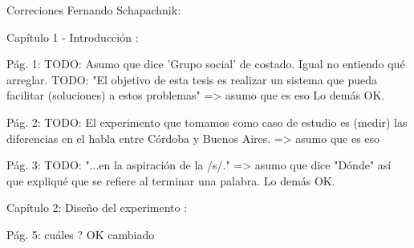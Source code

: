 Correciones Fernando Schapachnik:

Capítulo 1 - Introducción :

Pág. 1:
TODO: Asumo que dice 'Grupo social' de costado. Igual no entiendo qué arreglar.
TODO: "El objetivo de esta tesis es realizar un sistema que pueda facilitar (soluciones) a estos problemas" => asumo que es eso
Lo demás OK. 

Pág. 2:
TODO: El experimento que tomamos como caso de estudio es (medir) las diferencias en el habla entre Córdoba y Buenos Aires. => asumo que es eso

Pág. 3:
TODO: "...en la aspiración de la /s/." => asumo que dice "Dónde" así que expliqué que se refiere al terminar una palabra.
Lo demás OK.

Capítulo 2: Diseño del experimento :

Pág. 5: 
cuáles ? OK cambiado 

